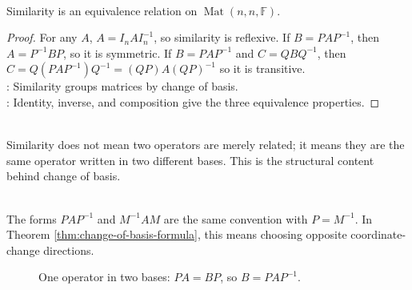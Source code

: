 \begin{proposition} \label{prop:similarity-equivalence-relation} \\
Similarity is an equivalence relation on $\operatorname{Mat}(n,n,\mathbb{F})$.
\begin{proof}
For any $A$, $A=I_nAI_n^{-1}$, so similarity is reflexive. If $B=PAP^{-1}$, then $A=P^{-1}BP$, so it is symmetric. If $B=PAP^{-1}$ and $C=QBQ^{-1}$, then $C=Q(PAP^{-1})Q^{-1}=(QP)A(QP)^{-1}$ so it is transitive.\\
: Similarity groups matrices by change of basis.\\
: Identity, inverse, and composition give the three equivalence properties.
\end{proof}
\end{proposition}

\begin{perspective} \\
Similarity does not mean two operators are merely related; it means they are the same operator written in two different bases. This is the structural content behind change of basis.
\end{perspective}

\begin{remark} \label{rem:similarity-convention} \\
The forms $PAP^{-1}$ and $M^{-1}AM$ are the same convention with $P=M^{-1}$. In Theorem \ref{thm:change-of-basis-formula}, this means choosing opposite coordinate-change directions.
\end{remark}

\begin{figure}[H]
  \centering
  
  \caption{One operator in two bases: $PA=BP$, so $B=PAP^{-1}$.}
  \label{fig:similarity-change-of-basis-bridge}
\end{figure}


